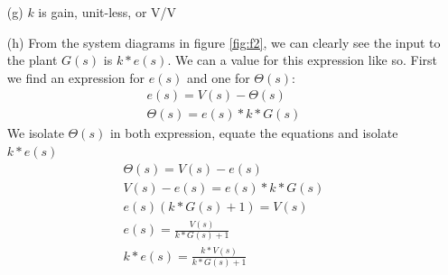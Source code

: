 \documentclass{article}
\begin{document}
\begin{itemize}
    \item[(g)] $k$ is gain, unit-less, or V/V
    \item[(h)] From the system diagrams in figure \ref{fig:f2}, we can clearly see the input to the plant $G(s)$ is $k*e(s)$. We can a value for this expression like so. First we find an expression for $e(s)$ and one for $\Theta(s)$:
    \begin{eqnarray}
        e(s) = V(s) - \Theta(s)\\
        \Theta(s) = e(s)*k*G(s)
    \end{eqnarray}
    We isolate $\Theta(s)$ in both expression, equate the equations and isolate $k*e(s)$
    \begin{eqnarray}
        \Theta(s) = V(s) - e(s)\\
        V(s) - e(s) = e(s)*k*G(s)\\
        e(s) \left(k*G(s) + 1\right) = V(s)\\
        e(s) = \frac{V(s)}{k*G(s) + 1}\\
        k*e(s) = \frac{k*V(s)}{k*G(s) + 1}
    \end{eqnarray}


\end{itemize}
\end{document}
